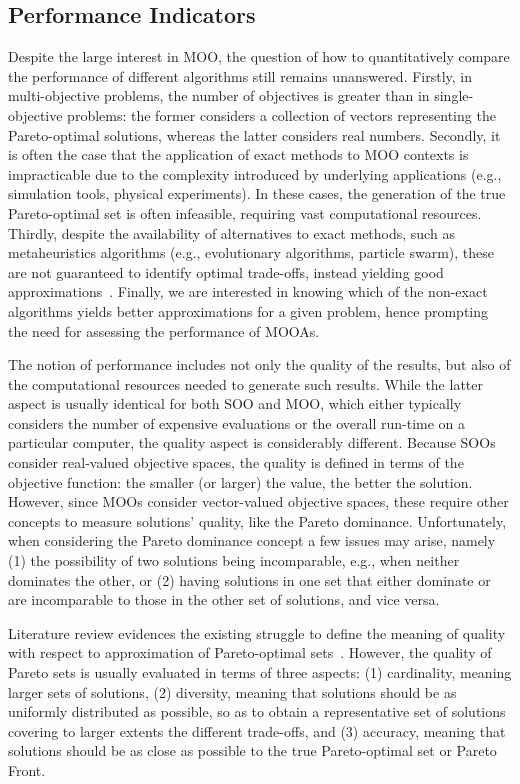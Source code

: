 	\subsection{Performance Indicators}
	\label{ssec:performance}
	Despite the large interest in \ac{MOO}, the question of how to quantitatively compare the performance of different algorithms still remains unanswered. Firstly, in multi-objective problems, the number of objectives is greater than in single-objective problems: the former considers a collection of vectors representing the Pareto-optimal solutions, whereas the latter considers real numbers. Secondly, it is often the case that the application of exact methods to \ac{MOO} contexts is impracticable due to the complexity introduced by underlying applications (e.g., simulation tools, physical experiments). In these cases, the generation of the true Pareto-optimal set is often infeasible, requiring vast computational resources. Thirdly, despite the availability of alternatives to exact methods, such as metaheuristics algorithms (e.g., evolutionary algorithms, particle swarm), these are not guaranteed to identify optimal trade-offs, instead yielding good approximations~\cite{Zitzler2003Metrics}. Finally, we are interested in knowing which of the non-exact algorithms yields better approximations for a given problem, hence prompting the need for assessing the performance of \acp{MOOA}.
	
	The notion of performance includes not only the quality of the results, but also of the computational resources needed to generate such results. While the latter aspect is usually identical for both \ac{SOO} and \ac{MOO}, which either typically considers the number of expensive evaluations or the overall run-time on a particular computer, the quality aspect is considerably different. Because \acp{SOO} consider real-valued objective spaces, the quality is defined in terms of the objective function: the smaller (or larger) the value, the better the solution. However, since \acp{MOO} consider vector-valued objective spaces, these require other concepts to measure solutions' quality, like the Pareto dominance. Unfortunately, when considering the Pareto dominance concept a few issues may arise, namely (1) the possibility of two solutions being incomparable, e.g., when neither dominates the other, or (2) having solutions in one set that either dominate or are incomparable to those in the other set of solutions, and vice versa. 
	
	Literature review evidences the existing struggle to define the meaning of quality with respect to approximation of Pareto-optimal sets~\cite{Knowles2002Metrics,Riquelme2015}. However, the quality of Pareto sets is usually evaluated in terms of three aspects: (1) cardinality, meaning larger sets of solutions, (2) diversity, meaning that solutions should be as uniformly distributed as possible, so as to obtain a representative set of solutions covering to larger extents the different trade-offs, and (3) accuracy, meaning that solutions should be as close as possible to the true Pareto-optimal set or Pareto Front. 
	
